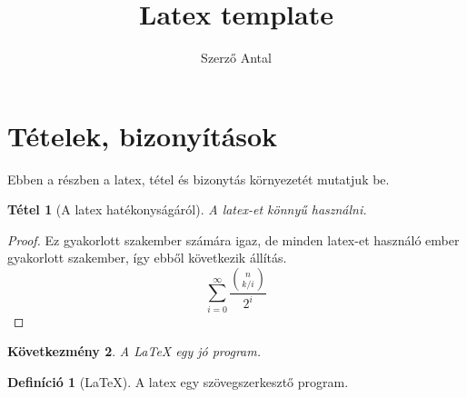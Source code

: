 \documentclass[12pt,a4paper,titlepage]{article}
\title{Latex template}
\author{Szerző Antal}
\begin{document}
\maketitle
\newpage

\tableofcontents
\newpage

\newtheorem{theorem}{Tétel}[section]
\newtheorem{corollary}[theorem]{Következmény}
\newtheorem{lemma}[theorem]{Lemma}

\theoremstyle{remark}
\newtheorem*{remark}{Megjegyzés}
\newtheorem*{assertion}{Állítás}
\newtheorem*{consequence}{Következmény}
\newtheorem*{notation}{Jelölés}

\theoremstyle{definition}
\newtheorem{definition}{Definíció}[section]

\section{Tételek, bizonyítások}
Ebben a részben a latex, tétel és bizonytás környezetét mutatjuk be.

\begin{theorem}[A latex hatékonyságáról]
\label{th:latex:efficiency}
A latex-et könnyű használni.
\end{theorem}

\begin{proof}
Ez gyakorlott szakember számára igaz, de minden latex-et használó ember
gyakorlott szakember, így ebből következik  állítás.
\[ \sum_{i = 0}^\infty \frac{\binom{n}{k / i}}{2^i} \]
\end{proof}

\begin{corollary}
A {\LaTeX} egy jó program.
\end{corollary}

\begin{definition}[LaTeX]
A latex egy szövegszerkesztő program.
\end{definition}
\end{document}
